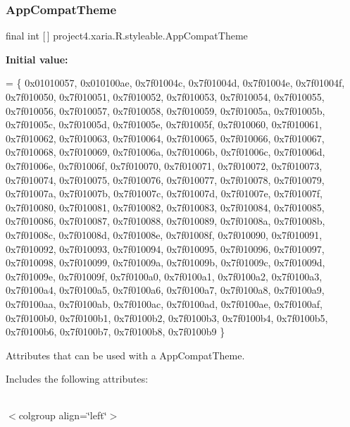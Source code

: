 \subsubsection{\texorpdfstring{App\+Compat\+Theme}{AppCompatTheme}}
{\footnotesize\ttfamily final int \mbox{[}$\,$\mbox{]} project4.\+xaria.\+R.\+styleable.\+App\+Compat\+Theme\hspace{0.3cm}{\ttfamily [static]}}

{\bfseries Initial value\+:}
\begin{DoxyCode}
= \{
            0x01010057, 0x010100ae, 0x7f01004c, 0x7f01004d,
            0x7f01004e, 0x7f01004f, 0x7f010050, 0x7f010051,
            0x7f010052, 0x7f010053, 0x7f010054, 0x7f010055,
            0x7f010056, 0x7f010057, 0x7f010058, 0x7f010059,
            0x7f01005a, 0x7f01005b, 0x7f01005c, 0x7f01005d,
            0x7f01005e, 0x7f01005f, 0x7f010060, 0x7f010061,
            0x7f010062, 0x7f010063, 0x7f010064, 0x7f010065,
            0x7f010066, 0x7f010067, 0x7f010068, 0x7f010069,
            0x7f01006a, 0x7f01006b, 0x7f01006c, 0x7f01006d,
            0x7f01006e, 0x7f01006f, 0x7f010070, 0x7f010071,
            0x7f010072, 0x7f010073, 0x7f010074, 0x7f010075,
            0x7f010076, 0x7f010077, 0x7f010078, 0x7f010079,
            0x7f01007a, 0x7f01007b, 0x7f01007c, 0x7f01007d,
            0x7f01007e, 0x7f01007f, 0x7f010080, 0x7f010081,
            0x7f010082, 0x7f010083, 0x7f010084, 0x7f010085,
            0x7f010086, 0x7f010087, 0x7f010088, 0x7f010089,
            0x7f01008a, 0x7f01008b, 0x7f01008c, 0x7f01008d,
            0x7f01008e, 0x7f01008f, 0x7f010090, 0x7f010091,
            0x7f010092, 0x7f010093, 0x7f010094, 0x7f010095,
            0x7f010096, 0x7f010097, 0x7f010098, 0x7f010099,
            0x7f01009a, 0x7f01009b, 0x7f01009c, 0x7f01009d,
            0x7f01009e, 0x7f01009f, 0x7f0100a0, 0x7f0100a1,
            0x7f0100a2, 0x7f0100a3, 0x7f0100a4, 0x7f0100a5,
            0x7f0100a6, 0x7f0100a7, 0x7f0100a8, 0x7f0100a9,
            0x7f0100aa, 0x7f0100ab, 0x7f0100ac, 0x7f0100ad,
            0x7f0100ae, 0x7f0100af, 0x7f0100b0, 0x7f0100b1,
            0x7f0100b2, 0x7f0100b3, 0x7f0100b4, 0x7f0100b5,
            0x7f0100b6, 0x7f0100b7, 0x7f0100b8, 0x7f0100b9
        \}
\end{DoxyCode}
Attributes that can be used with a App\+Compat\+Theme. 

Includes the following attributes\+:

\tabulinesep=1mm
\begin{longtabu} spread 0pt [c]{*{0}{|X[-1]}|}
\hline
\end{longtabu}
$<$colgroup align=\char`\"{}left\char`\"{}$>$ 

